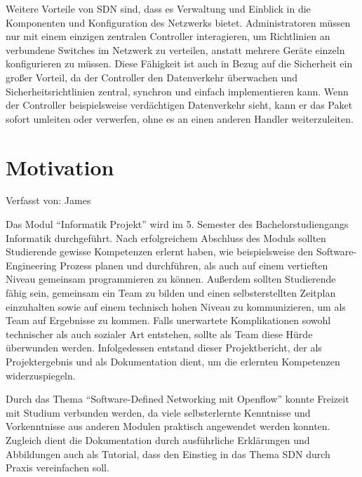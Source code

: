 \documentclass[fontsize=12pt,paper=a4,open=any,parskip=half,
  twoside=false,toc=listof,toc=bibliography,fleqn,leqno,
  captions=nooneline,captions=tableabove,british]{scrbook}
\begin{document}
Weitere Vorteile von SDN sind, dass es Verwaltung und Einblick in die Komponenten und Konfiguration des Netzwerks bietet. Administratoren müssen nur mit einem einzigen zentralen Controller interagieren, um Richtlinien an verbundene Switches im Netzwerk zu verteilen, anstatt mehrere Geräte einzeln konfigurieren zu müssen. Diese Fähigkeit ist auch in Bezug auf die Sicherheit ein großer Vorteil, da der Controller den Datenverkehr überwachen und Sicherheitsrichtlinien zentral, synchron und einfach implementieren kann. Wenn der Controller beispielsweise verdächtigen Datenverkehr sieht, kann er das Paket sofort umleiten oder verwerfen, ohne es an einen anderen Handler weiterzuleiten.\cite{sdnbenefitstung}



\section{Motivation}
{\tiny Verfasst von: James\par}
Das Modul “Informatik Projekt” wird im 5. Semester des Bachelorstudiengangs Informatik durchgeführt. Nach erfolgreichem Abschluss des Moduls sollten Studierende gewisse Kompetenzen erlernt haben, wie beispielsweise den Software-Engineering Prozess planen und durchführen, als auch auf einem vertieften Niveau gemeinsam programmieren zu können. Außerdem sollten Studierende fähig sein, gemeinsam ein Team zu bilden und einen selbsterstellten Zeitplan einzuhalten sowie auf einem technisch hohen Niveau zu kommunizieren, um als Team auf Ergebnisse zu kommen. Falls unerwartete Komplikationen sowohl technischer als auch sozialer Art entstehen, sollte als Team diese Hürde überwunden werden. Infolgedessen entstand dieser Projektbericht, der als Projektergebnis und als Dokumentation dient, um die erlernten Kompetenzen widerzuspiegeln.\par
Durch das Thema “Software-Defined Networking mit Openflow” konnte Freizeit mit Studium verbunden werden, da viele selbsterlernte Kenntnisse und Vorkenntnisse aus anderen Modulen praktisch angewendet werden konnten. Zugleich dient die Dokumentation durch ausführliche Erklärungen und Abbildungen auch als Tutorial, dass den Einstieg in das Thema SDN durch Praxis vereinfachen soll.
\end{document}
